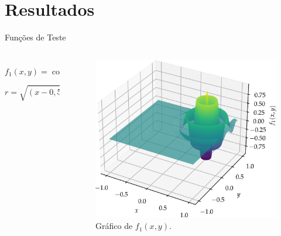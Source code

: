 \section{Resultados}

\begin{frame}{Funções de Teste}
  \begin{columns}
    \begin{column}{0.5\textwidth}
      $$ f_1(x,y) = \cos(9\pi r)\exp\left\{-\frac{r^2}{(0,4)^2}\right\} $$
      $$ r = \sqrt{
          \left(x - 0,5\right)^2 +
          \left(y - 0,5\right)^2
        } $$
    \end{column}
    \begin{column}{0.5\textwidth}
      \begin{figure}
        \centering
        \includegraphics[width=\textwidth]{imagens/graph_damped_cossine.png}
        \caption{Gráfico de $f_1(x,y)$.}
      \end{figure}
    \end{column}
  \end{columns}
\end{frame}

